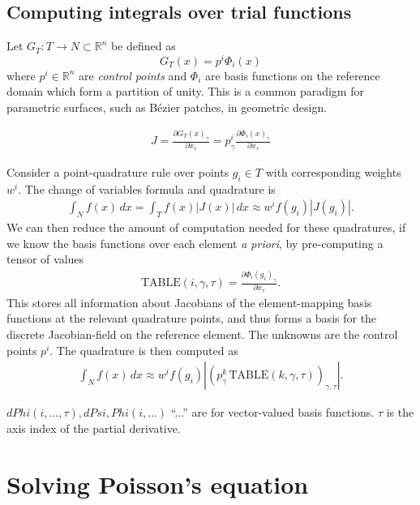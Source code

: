 \documentclass{article}
\newcommand{\pdf}[2]{\frac{\partial #1}{\partial #2}}
\begin{document}
\subsection{Computing integrals over trial functions} %

% 

Let $G_T: T \rightarrow N \subset \mathbb{R}^n$ be defined as
    $$G_T(x) = p^i \Phi_i(x)$$
where $p^i \in \mathbb{R}^n$ are \textit{control points} and $\Phi_i$ are basis functions on the reference domain which form a partition of unity. This is a common paradigm for parametric surfaces,
such as B\'ezier patches, in geometric design.

\begin{align*}
    J = \pdf{G_T(x)_\gamma}{x_\tau} = p^i_\gamma\pdf{\Phi_i(x)_\gamma}{x_\tau}
\end{align*}

Consider a point-quadrature rule over points $g_i \in T$ with corresponding weights $w^i$.
The change of variables formula and quadrature is
\begin{align*}
    \int_N f(x)\, dx = \int_T f(x)|J(x)|\, dx \approx w^i f(g_i)|J(g_i)|.
\end{align*}
We can then reduce the amount of computation needed for these quadratures, if we know the basis functions over each element \textit{a priori},
by pre-computing a tensor of values
\begin{align*}
    \text{TABLE}(i, \gamma, \tau) = \pdf{\Phi_i(g_i)_\gamma}{x_\tau}.
\end{align*}
This stores all information about Jacobians of the element-mapping basis functions at the relevant
quadrature points, and thus forms a basis for the discrete Jacobian-field on the reference element.
The unknowns are the control points $p^i$. The quadrature is then computed as
\begin{align*}
    \int_N{f(x)\, dx} \approx w^i f(g_i) \left\vert\left(p^k_\gamma\,\text{TABLE}(k, \gamma, \tau)\right)_{\gamma,\tau}\right\vert.
\end{align*}

$dPhi(i, ..., \tau), dPsi, Phi(i, ...)$
``...'' are for vector-valued basis functions. $\tau$ is the axis index of the partial derivative.

\section{Solving Poisson's equation}
\end{document}
